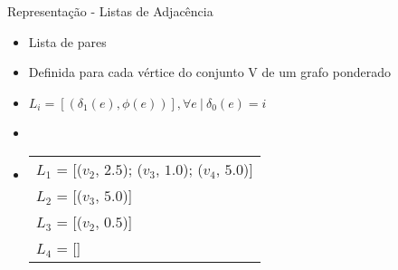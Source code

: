 \begin{frame}{Representação - Listas de Adjacência}
    \begin{itemize}
        \item Lista de pares
        \item Definida para cada vértice do conjunto V de um grafo ponderado
        \item $L_i = [(\delta_1(e), \phi(e))], \forall e \ | \ \delta_0(e) = i$
        \item []
        \item []
            \begin{tabular}{l}
                    $L_1$ = [($v_2$, $2.5$); ($v_3$, $1.0$); ($v_4$, $5.0$)]\\
                    $L_2$ = [($v_3$, $5.0$)]\\
                    $L_3$ = [($v_2$, $0.5$)]\\
                    $L_4$ = []\\
            \end{tabular}
    \end{itemize}
\end{frame}